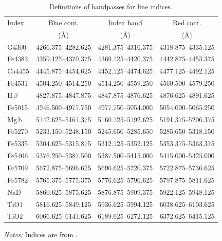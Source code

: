 		\begin{table}
			\centering
		\begin{threeparttable}
			\caption{Definitions of bandpasses for line indices.}
			\label{tab:abIndex}
			\begin{tabular}{l c c c}
				\hline
				\hline
				Index 	& Blue cont. 		& Index band 		& Red cont. \\
						& (\AA) 			& (\AA)				& (\AA) \\
				\hline 
				G4300 	& 4266.375--4282.625 & 4281.375--4316.375 & 4318.875--4335.125 \\
				Fe4383 	& 4359.125--4370.375 & 4369.125--4420.375 & 4442.875--4455.375 \\
				Ca4455 	& 4445.875--4454.625 & 4452.125--4474.625 & 4477.125--4492.125 \\
				Fe4531 	& 4504.250--4514.250 & 4514.250--4559.250 & 4560.500--4579.250 \\
				H\,$\beta$ & 4827.875--4847.875 & 4847.875--4876.625 & 4876.625--4891.625 \\
				Fe5015 	& 4946.500--4977.750 & 4977.750--5054.000 & 5054.000--5065.250 \\
				Mg\,b 	& 5142.625--5161.375 & 5160.125--5192.625 & 5191.375--5206.375 \\
				Fe5270 	& 5233.150--5248.150 & 5245.650--5285.650 & 5285.650--5318.150 \\
				Fe5335 	& 5304.625--5315.875 & 5312.125--5352.125 & 5353.375--5363.375 \\
				Fe5406 	& 5376.250--5387.500 & 5387.500--5415.000 & 5415.000--5425.000 \\
				Fe5709 	& 5672.875--5696.625 & 5696.625--5720.375 & 5722.875--5736.625 \\
				Fe5782 	& 5765.375--5775.375 & 5776.625--5796.625 & 5797.875--5811.625 \\
				NaD 	& 5860.625--5875.625 & 5876.875--5909.375 & 5922.125--5948.125 \\
				TiO1 	& 5816.625--5849.125 & 5936.625--5994.125 & 6038.625--6103.625 \\
				TiO2 	& 6066.625--6141.625 & 6189.625--6272.125 & 6372.625--6415.125 \\
				\hline
				\hline
			\end{tabular}
			\begin{tablenotes}
			\footnotesize
			\item \textit{Notes:} Indices are from \citet{Trager1998}.
			\end{tablenotes}
		\end{threeparttable}
		\end{table}


